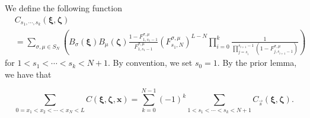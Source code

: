\documentclass[a4paper,11pt]{article}
\theoremstyle{definition}
\begin{document}
We define the following function
\begin{equation}
\begin{split}
    &C_{s_1, \cdots, s_k}(\boldsymbol{\xi}, \boldsymbol{\zeta}) \\
    &= \sum_{\sigma, \mu \in S_N}\left( B_{\sigma}(\boldsymbol{\xi})B_{\mu}(\boldsymbol{\zeta})
   \frac{1 - F_{1, s_1-1}^{\sigma, \mu}}{F_{1, s_1-1}^{\sigma, \mu}}(F_{s_1, N}^{\sigma, \mu})^{L-N} \prod_{i=0}^{k} \frac{1}{\prod_{j=s_i}^{s_{i+1}-1}(1 - F_{j, s_{i+1}-1}^{\sigma,\mu}) }\right)
\end{split}
\end{equation}
for $1 < s_1 < \cdots < s_k < N+1$. By convention, we set $s_0 =1$. By the prior lemma, we have that

\begin{equation}\label{e:CDecomp}
    \sum_{0=x_1<x_2<\cdots<x_N<L}C(\boldsymbol{\xi},\boldsymbol{\zeta},\mathbf{x})=\sum_{k=0}^{N-1}(-1)^k\sum_{1<s_1<\cdots<s_k<N+1}C_{\vec{s}}(\boldsymbol{\xi},\boldsymbol{\zeta}).
\end{equation}
\end{document}
